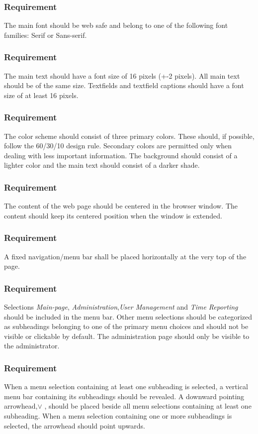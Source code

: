 \documentclass{article}
\begin{document}
\subsubsection{Requirement}
The main font should be web safe and belong to one of the following font
families: Serif or Sans-serif.
\subsubsection{Requirement}
The main text should have a font size of 16 pixels (+-2 pixels). All main
text should be of the same size.
Textfields and textfield captions should have a font size of at least 16
pixels.
\subsubsection{Requirement}
The color scheme should consist of three primary colors. These should, if
possible, follow the 60/30/10 design rule. Secondary colors are permitted
only when dealing with less important information.
The background should consist of a lighter color and the main text should
consist of a darker shade.
\subsubsection{Requirement}
The content of the web page should be centered in the browser window.
The content should keep its centered position when the window is extended.
\subsubsection{Requirement}
A fixed navigation/menu bar shall be placed horizontally at the very top
of the page.
\subsubsection{Requirement}
Selections \textit{Main-page}, \textit{Administration},\textit{User Management} and \textit{Time Reporting} 
should be included in the menu bar. Other menu selections
should be categorized as subheadings belonging to one of the primary
menu choices and should not be visible or clickable by default.
The administration page should only be visible to the administrator.
\subsubsection{Requirement}
When a menu selection containing at least one subheading is selected, a
vertical menu bar containing its subheadings should be revealed.
A downward pointing arrowhead,$\vee$ , should be placed beside all menu selections containing at least one subheading. 
When a menu selection containing one or more subheadings is selected, the arrowhead should point
upwards.
\end{document}
